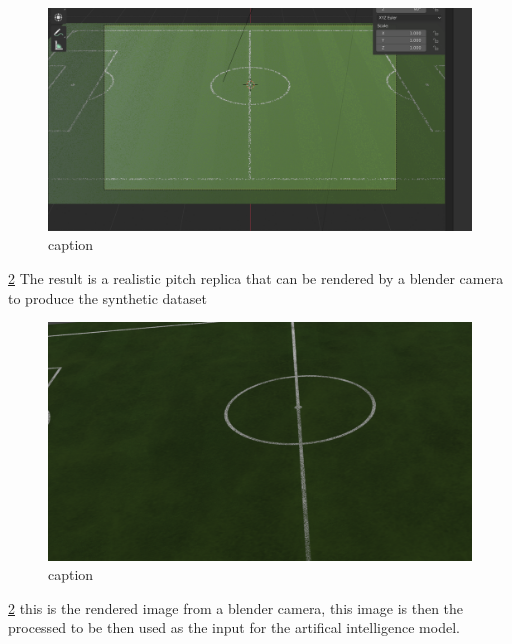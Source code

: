 \documentclass[
11pt,
twoside
]{report}
\begin{document}
\begin{figure}[H]
    \includegraphics[keepaspectratio, width=\columnwidth]{Screenshot_2021-12-17_19-08-06.png}
    \caption{caption}
    \label{img:1}
\end{figure}
\ref{img:1} The result is a realistic pitch replica that can be rendered by a blender camera to produce the synthetic dataset


\begin{figure}[H]
    \includegraphics[keepaspectratio, width=\columnwidth]{image.png}
    \caption{caption}
    \label{img:1}
\end{figure}
\ref{img:1} this is the rendered image from a blender camera, this image is then the processed to be then used as the input for the artifical intelligence model.
\end{document}
